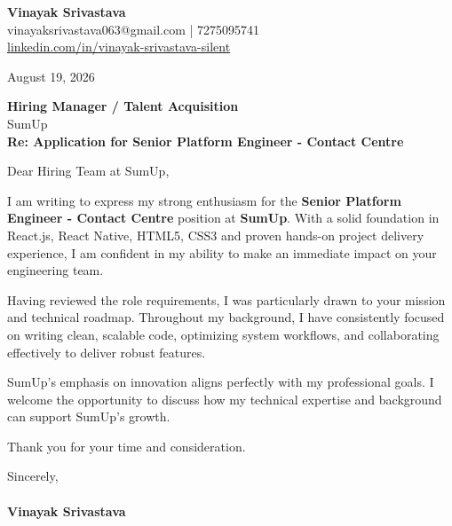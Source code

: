 \documentclass[11pt,a4paper]{article}
\begin{document}
\thispagestyle{empty}

{\Large \textbf{Vinayak Srivastava}}\\
vinayaksrivastava063@gmail.com | 7275095741 \\
\url{linkedin.com/in/vinayak-srivastava-silent}

\vspace{1em}
\hfill August 19, 2026

\textbf{Hiring Manager / Talent Acquisition}\\
SumUp\\

\vspace{1.5em}
\textbf{Re: Application for Senior Platform Engineer - Contact Centre}

\vspace{1em}
Dear Hiring Team at SumUp,

I am writing to express my strong enthusiasm for the \textbf{Senior Platform Engineer - Contact Centre} position at \textbf{SumUp}. With a solid foundation in React.js, React Native, HTML5, CSS3 and proven hands-on project delivery experience, I am confident in my ability to make an immediate impact on your engineering team.

Having reviewed the role requirements, I was particularly drawn to your mission and technical roadmap. Throughout my background, I have consistently focused on writing clean, scalable code, optimizing system workflows, and collaborating effectively to deliver robust features.

SumUp's emphasis on innovation aligns perfectly with my professional goals. I welcome the opportunity to discuss how my technical expertise and background can support SumUp's growth.

Thank you for your time and consideration.

\vspace{1.5em}
Sincerely,\\
\vspace{1em}\\
\textbf{Vinayak Srivastava}
\end{document}
